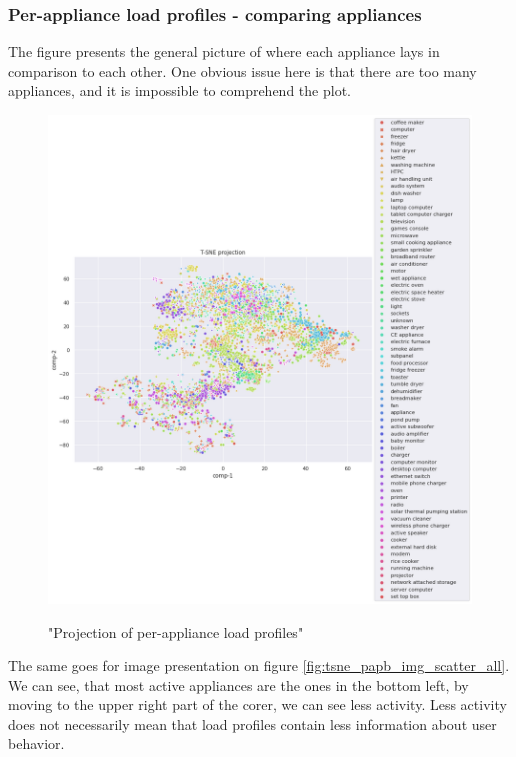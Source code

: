\subsubsection{Per-appliance load profiles - comparing appliances}

The figure \label{fig:tsne_papb_scatter_all} presents
the general picture of where each appliance lays in comparison to each other.
One obvious issue here is that there are too many appliances, and it is impossible to comprehend the plot.

\begin{figure}[H]
	\centering
	\caption{"Projection of per-appliance load profiles"}
	\includegraphics[width=1.2\textwidth]{Figures/TSNE/TSNE_results/all/scatter_all_all_lgimgs.png}
	\label{fig:tsne_papb_scatter_all}
\end{figure}

The same goes for image presentation on figure \ref{fig:tsne_papb_img_scatter_all}. 
We can see, that most active appliances are the ones in the bottom left,
by moving to the upper right part of the corer, we can see less activity.
Less activity does not necessarily mean that load profiles contain less information about user behavior.

